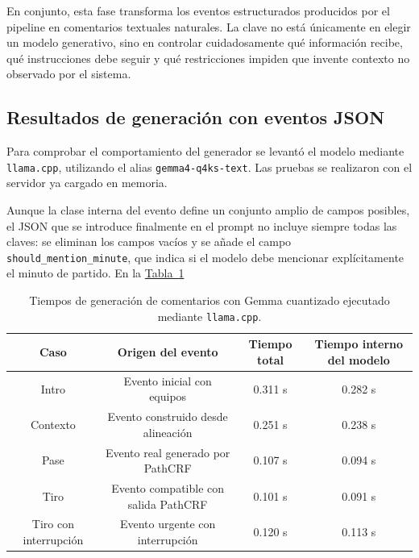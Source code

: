 En conjunto, esta fase transforma los eventos estructurados producidos por el pipeline en comentarios textuales naturales. La clave no está únicamente en elegir un modelo generativo, sino en controlar cuidadosamente qué información recibe, qué instrucciones debe seguir y qué restricciones impiden que invente contexto no observado por el sistema.

\subsection{Resultados de generación con eventos JSON}

Para comprobar el comportamiento del generador se levantó el modelo  mediante \texttt{llama.cpp}, utilizando el alias \texttt{gemma4-q4ks-text}. Las pruebas se realizaron con el servidor ya cargado en memoria.

Aunque la clase interna del evento define un conjunto amplio de campos posibles, el JSON que se introduce finalmente en el prompt no incluye siempre todas las claves: se eliminan los campos vacíos y se añade el campo \texttt{should\_mention\_minute}, que indica si el modelo debe mencionar explícitamente el minuto de partido. En la \hyperref[tab:tiempos_generacion_gemma]{Tabla~\ref*{tab:tiempos_generacion_gemma}}

\begin{table}[H]
    \centering
    \scriptsize
    \begin{tabular}{c|c|c|c}
        \textbf{Caso} & \textbf{Origen del evento} & \textbf{Tiempo total} & \textbf{Tiempo interno del modelo} \\
        \hline\hline
        Intro & Evento inicial con equipos & 0.311 s & 0.282 s \\
        Contexto & Evento construido desde alineación & 0.251 s & 0.238 s \\
        Pase & Evento real generado por PathCRF & 0.107 s & 0.094 s \\
        Tiro & Evento compatible con salida PathCRF & 0.101 s & 0.091 s \\
        Tiro con interrupción & Evento urgente con interrupción & 0.120 s & 0.113 s \\
        \hline
    \end{tabular}
    \caption{Tiempos de generación de comentarios con Gemma cuantizado ejecutado mediante \texttt{llama.cpp}.}
    \label{tab:tiempos_generacion_gemma}
\end{table}

